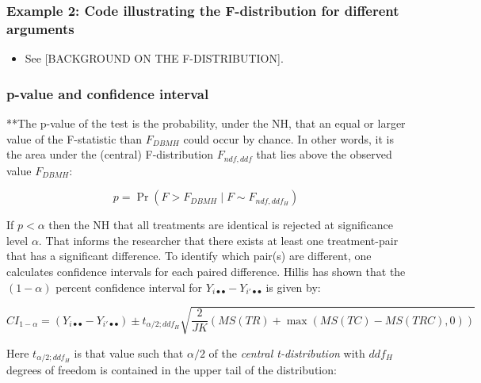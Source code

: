 \documentclass[
]{book}
\providecommand{\tightlist}{%
  \setlength{\itemsep}{0pt}\setlength{\parskip}{0pt}}
\begin{document}
\hypertarget{example-2-code-illustrating-the-f-distribution-for-different-arguments}{%
\subsubsection{Example 2: Code illustrating the F-distribution for different arguments}\label{example-2-code-illustrating-the-f-distribution-for-different-arguments}}

\begin{itemize}
\tightlist
\item
  See {[}BACKGROUND ON THE F-DISTRIBUTION{]}.
\end{itemize}

\hypertarget{p-value-and-confidence-interval}{%
\subsubsection{p-value and confidence interval}\label{p-value-and-confidence-interval}}

**The p-value of the test is the probability, under the NH, that an equal or larger value of the F-statistic than \(F_{DBMH}\) could occur by chance. In other words, it is the area under the (central) F-distribution \(F_{ndf,ddf}\) that lies above the observed value \(F_{DBMH}\):

\begin{equation}
p=\Pr\left ( F > F_{DBMH} \mid F \sim F_{ndf,ddf_H} \right )
\label{eq:pValueRRRC}
\end{equation}

If \(p < \alpha\) then the NH that all treatments are identical is rejected at significance level \(\alpha\). That informs the researcher that there exists at least one treatment-pair that has a significant difference. To identify which pair(s) are different, one calculates confidence intervals for each paired difference. Hillis has shown that the \((1-\alpha)\) percent confidence interval for \(Y_{i \bullet \bullet} - Y_{i' \bullet \bullet}\) is given by:

\begin{equation}
CI_{1-\alpha}=\left ( Y_{i \bullet \bullet} - Y_{i' \bullet \bullet} \right ) \pm t_{\alpha/2;ddf_H} \sqrt{\frac{2}{JK}\left ( MS(TR) + \max\left ( MS(TC)-MS(TRC),0 \right ) \right )}
\end{equation}

Here \(t_{\alpha/2;ddf_H}\) is that value such that \(\alpha/2\) of the \emph{central t-distribution} with \(ddf_H\) degrees of freedom is contained in the upper tail of the distribution:
\end{document}
